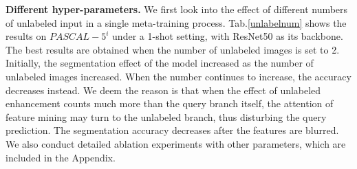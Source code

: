 \documentclass[letterpaper]{article} %
\begin{document}
\begin{table}[!t]
\centering
\begin{threeparttable}
\end{threeparttable}
\caption{Ablation studies of different numbers of unlabeled images in the single meta-training process.}
\label{unlabelnum}
\end{table}

\textbf{Different hyper-parameters.} We first look into the effect of different numbers of unlabeled input in a single meta-training process. Tab.\ref{unlabelnum} shows the results on $PASCAL-5^i$ under a 1-shot setting, with ResNet50 as its backbone. The best results are obtained when the number of unlabeled images is set to 2. Initially, the segmentation effect of the model increased as the number of unlabeled images increased. When the number continues to increase, the accuracy decreases instead. We deem the reason is that when the effect of unlabeled enhancement counts much more than the query branch itself, the attention of feature mining may turn to the unlabeled branch, thus disturbing the query prediction. The segmentation accuracy decreases after the features are blurred. We also conduct detailed ablation experiments with other parameters, which are included in the Appendix.


\vspace{-1.92mm}
\end{document}
